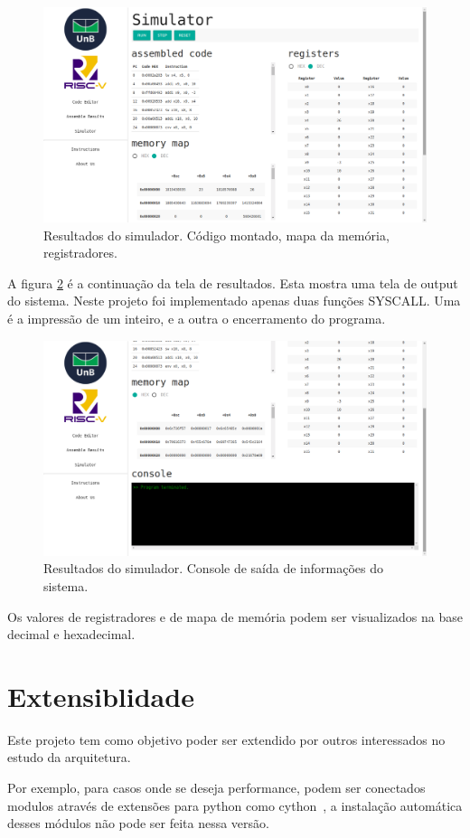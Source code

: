 	\begin{figure}[h!]
	  \includegraphics[width=\linewidth]{img/simulator_results_1.png}
	  \caption{Resultados do simulador. Código montado, mapa da memória, registradores. }
	  \label{fig:simulator_results_1}
	\end{figure}

	A figura \ref{fig:simulator_results_2} é a continuação da tela de resultados. Esta mostra uma tela de output do sistema. Neste projeto foi implementado apenas duas funções SYSCALL. Uma é a impressão de um inteiro, e a outra o encerramento do programa.  

	\begin{figure}[h!]
	  \includegraphics[width=\linewidth]{img/simulator_results_2.png}
	  \caption{Resultados do simulador. Console de saída de informações do sistema.}
	  \label{fig:simulator_results_2}
	\end{figure}

	Os valores de registradores e de mapa de memória podem ser visualizados na base decimal e hexadecimal.


\section{Extensiblidade}

	Este projeto tem como objetivo poder ser extendido por outros interessados no estudo da arquitetura. 

	Por exemplo, para casos onde se deseja performance, podem ser conectados modulos através de extensões para python como cython~\cite{cython_home}, a instalação automática desses módulos não pode ser feita nessa versão.
